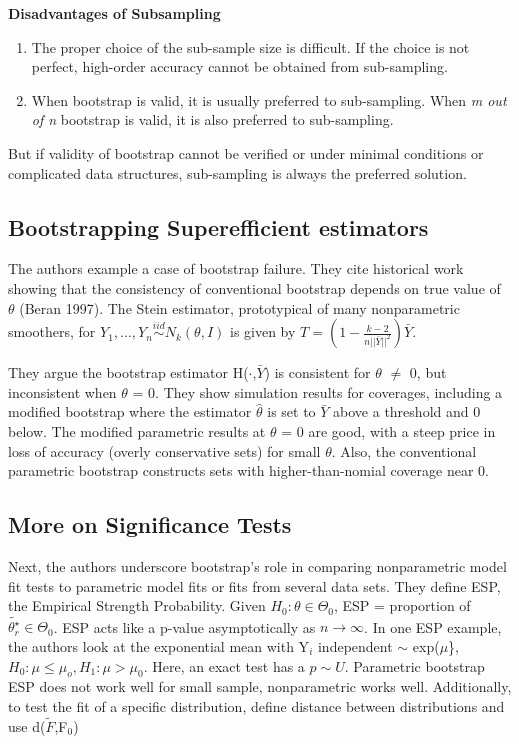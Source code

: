 \documentclass[11pt]{article}
\begin{document}
\textbf{Disadvantages of Subsampling} 

\begin{enumerate}
\item The proper choice of the sub-sample size is difficult. If the
   choice is not perfect,  high-order accuracy cannot be obtained from sub-sampling.
\item When bootstrap is valid, it is usually preferred to sub-sampling.
   When \emph{m out of n} bootstrap is valid, it is also preferred to sub-sampling.
\end{enumerate}

But if validity of bootstrap cannot be verified or under minimal
conditions or complicated data structures, sub-sampling is always the preferred solution.
\subsection{Bootstrapping Superefficient estimators}
\label{sec-1-6}


The authors example a case of bootstrap failure. They cite 
historical work showing that the consistency  of conventional
bootstrap depends on true value of $\theta$ (Beran 1997). The Stein
estimator, prototypical of many nonparametric smoothers, for  $Y_1,
\ldots, Y_n \overset{iid}{\sim} N_k(\theta,I)$ is given by $T = \left( 1 - \frac{k-2}{n||\bar{Y}||^2}\right)\bar{Y}$.

They argue the bootstrap estimator H($\cdot$,$\bar{Y}$) is consistent for
$\theta$ $\neq$ 0, but inconsistent when $\theta$ = 0. They show simulation 
results for coverages, including a modified bootstrap where the
estimator $\hat{\theta}$ is set to $\bar{Y}$ above a threshold and 0
below. The modified parametric results at $\theta$ = 0 are good, with a steep
price in loss of accuracy (overly conservative sets) for small
$\theta$. Also, the conventional parametric bootstrap constructs sets
with higher-than-nomial coverage near 0.
\subsection{More on Significance Tests}
\label{sec-1-7}


Next, the authors underscore bootstrap's role in comparing
nonparametric model fit tests to parametric model fits or fits from
several data sets. They define ESP, the Empirical Strength
Probability. Given $H_0: \theta \in \Theta_0$, ESP = proportion of
$\tilde{\theta^{\star}_r} \in \Theta_0$. ESP acts like a p-value 
asymptotically as $n\rightarrow \infty$. In one ESP example, the
authors look at the exponential mean with Y$_i$ independent $\sim$
exp($\mu$\}, $H_0: \mu \leq \mu_o, H_1: \mu > \mu_0$. Here, an
exact test has a $p \sim U$. Parametric bootstrap ESP does 
not work well for small sample, nonparametric works well.
Additionally, to test the fit of a specific distribution, 
define distance between distributions and use d($\tilde{F}$,F$_0$)
\end{document}

